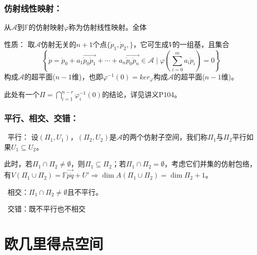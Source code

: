 \documentclass[zihao=-4,UTF8]{report}
\def\F{\mathbb{F}}
\def\A{\mathscr{A}}
\theoremstyle{mystyle} %
\begin{document}
\subsubsection{仿射线性映射：}
从$\A$到$\F$的仿射映射$\varphi$称为仿射线性映射。全体\par
性质：
取$\A$仿射无关的$n+1$个点$\{\dot{p}_1,\dot{p}_2,\}$，它可生成$V$的一组基，且集合
\begin{equation*}
    \left\{ \dot{p} = \dot{p}_0 + a_1\overrightarrow{\dot{p}_0\dot{p}_1} + \cdots + a_n\overrightarrow{\dot{p}_0\dot{p}_n} \in \A \mid \varphi(\sum_{i=0}^{m} a_i\dot{p}_i) = 0 \right\}
\end{equation*}
构成$\A$的超平面($n-1$维)，也即$\varphi^{-1}(0)= ker_\varphi $构成$\A$的超平面($n-1$维)。
{\par\color{gray}\small
此处有一个$\Pi  = \bigcap_{i=1}^{n-r}\varphi^{-1}_i(0) $的结论，详见讲义P104。
\par}

\subsubsection{平行、相交、交错：}
\par{}\ 平行： 设$(\Pi_1, U_1)$，$(\Pi_2, U_2)$是$\A$的两个仿射子空间，我们称$\Pi_1$与$\Pi_2$平行如果$U_1 \subseteq U_2$。\par
此时，若$\Pi_1 \cap \Pi_2 \ne \emptyset$，则$\Pi_1 \subseteq \Pi_2$；若$\Pi_1 \cap \Pi_2 = \emptyset$，考虑它们并集的仿射包络，有$V(\Pi_1\cup\Pi_2 ) = \F\overrightarrow{\dot{p}\dot{q}} + U' \Longrightarrow \dim A(\Pi_1\cup\Pi_2 ) = \dim \Pi_2 + 1$。\par   \par
{}\  相交：$\Pi_1 \cap \Pi_2 \ne \emptyset$且不平行。   \par
{}\  交错：既不平行也不相交 \par

\section{欧几里得点空间}
\end{document}
